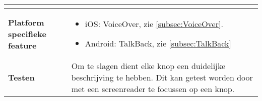 \begin{table}[H]
\begin{tabular}{|l|p{12cm}|}
\begin{itemize}
        \end{itemize}                                                                                                                                                                                                                                                                                                                                                                                                                    \\ 
      \hline
      \textbf{Platform specifieke feature} & \begin{itemize}
          \item iOS: VoiceOver, zie \ref{subsec:VoiceOver}.
          \item Android: TalkBack, zie \ref{subsec:TalkBack}
      \end{itemize}                                                                                                                                                                       \\ 
        \hline
        \textbf{Testen}                       & Om te slagen dient elke knop een duidelijke beschrijving te hebben. Dit kan getest worden door met een screenreader te focussen op een knop.                                                                                                                                                                                              \\
        \hline
    \end{tabular}
    
\end{table}
\newpage
